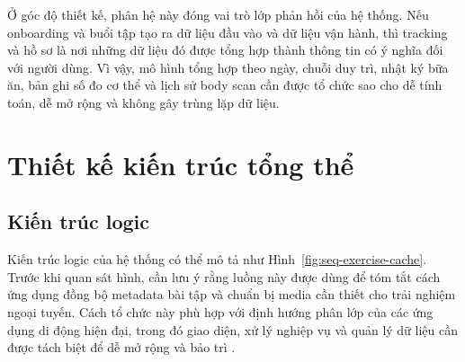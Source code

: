Ở góc độ thiết kế, phân hệ này đóng vai trò lớp phản hồi của hệ thống. Nếu onboarding và buổi tập tạo ra dữ liệu đầu vào và dữ liệu vận hành, thì tracking và hồ sơ là nơi những dữ liệu đó được tổng hợp thành thông tin có ý nghĩa đối với người dùng. Vì vậy, mô hình tổng hợp theo ngày, chuỗi duy trì, nhật ký bữa ăn, bản ghi số đo cơ thể và lịch sử body scan cần được tổ chức sao cho dễ tính toán, dễ mở rộng và không gây trùng lặp dữ liệu.

\section{Thiết kế kiến trúc tổng thể}

\subsection{Kiến trúc logic}

Kiến trúc logic của hệ thống có thể mô tả như Hình~\ref{fig:seq-exercise-cache}. Trước khi quan sát hình, cần lưu ý rằng luồng này được dùng để tóm tắt cách ứng dụng đồng bộ metadata bài tập và chuẩn bị media cần thiết cho trải nghiệm ngoại tuyến. Cách tổ chức này phù hợp với định hướng phân lớp của các ứng dụng di động hiện đại, trong đó giao diện, xử lý nghiệp vụ và quản lý dữ liệu cần được tách biệt để dễ mở rộng và bảo trì \cite{android_jetpack,android_compose,android_navigation_compose,firebase_firestore}.

